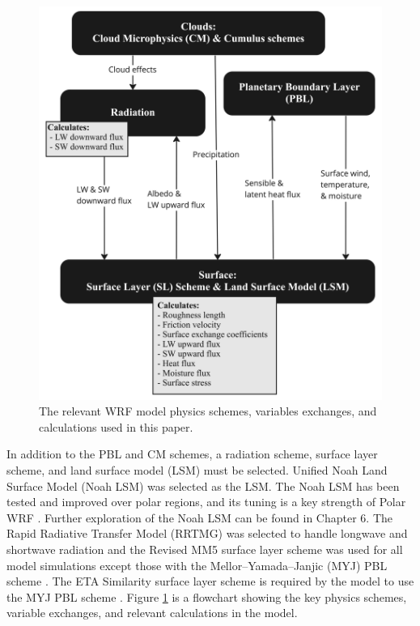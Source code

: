 \begin{figure}[p!]
    \centering 
    \includegraphics[width=1\linewidth]{figures/chapter3/WRF_Flowchart.jpg}
    \caption[WRF Model physics scheme exchanges.]{The relevant WRF model physics schemes, variables exchanges, and calculations used in this paper.}
    \label{fig:wrfflow}
\end{figure}

In addition to the PBL and CM schemes, a radiation scheme, surface layer scheme, and land surface model (LSM) must be selected. Unified Noah Land Surface Model (Noah LSM) was selected as the LSM. The Noah LSM has been tested and improved over polar regions, and its tuning is a key strength of Polar WRF \citep{mukul:2004, hines:2015, tewari:2004}. Further exploration of the Noah LSM can be found in Chapter 6. The Rapid Radiative Transfer Model (RRTMG) was selected to handle longwave and shortwave radiation \citep{mlawer:1997} and the Revised MM5 surface layer scheme was used for all model simulations except those with the Mellor–Yamada–Janjic (MYJ) PBL scheme \citep{jimenez:2012}. The ETA Similarity surface layer scheme is required by the model to use the MYJ PBL scheme \citep{janic:2001}. Figure \ref{fig:wrfflow} is a flowchart showing the key physics schemes, variable exchanges, and relevant calculations in the model.

